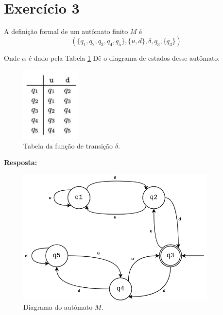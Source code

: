 \documentclass[a4paper, 12pt]{article}
\begin{document}
\newpage
\section{Exercício 3}

A definição formal de um autômato finito $M$ é 
$$(\{q_1, q_2, q_3, q_4, q_5\}, \{u, d\}, \delta, q_3, \{q_3\})$$

Onde $\alpha$ é dado pela Tabela \ref{fig:table_delta} Dê o diagrama de estados desse autômato.

\begin{figure}[!ht]
    \centering
    \includegraphics[width=3cm]{./imgs/table_delta.png}
    \caption{Tabela da função de transição $\delta$.}
    \label{fig:table_delta}
\end{figure}

\textbf{Resposta:}

\begin{figure}
    \includegraphics[width=10cm]{./imgs/lfa-trab-1.png}
    \centering
    \caption{Diagrama do autômato $M$.}
    \label{fig:diag_m}
\end{figure}
\end{document}

